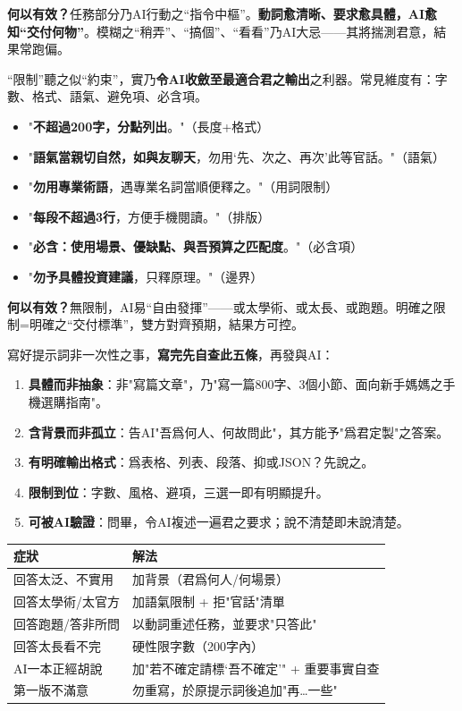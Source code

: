 \textbf{何以有效？}任務部分乃AI行動之“指令中樞”。\textbf{動詞愈清晰、要求愈具體，AI愈知“交付何物”}。模糊之“稍弄”、“搞個”、“看看”乃AI大忌——其將揣測君意，結果常跑偏。


“限制”聽之似“約束”，實乃\textbf{令AI收斂至最適合君之輸出}之利器。常見維度有：字數、格式、語氣、避免項、必含項。


\begin{itemize}
  \item "\textbf{不超過200字，分點列出}。"（長度+格式）
  \item "\textbf{語氣當親切自然，如與友聊天}，勿用‘先、次之、再次’此等官話。"（語氣）
  \item "\textbf{勿用專業術語}，遇專業名詞當順便釋之。"（用詞限制）
  \item "\textbf{每段不超過3行}，方便手機閱讀。"（排版）
  \item "\textbf{必含：使用場景、優缺點、與吾預算之匹配度}。"（必含項）
  \item "\textbf{勿予具體投資建議}，只釋原理。"（邊界）
\end{itemize}

\textbf{何以有效？}無限制，AI易“自由發揮”——或太學術、或太長、或跑題。明確之限制=明確之“交付標準”，雙方對齊預期，結果方可控。


寫好提示詞非一次性之事，\textbf{寫完先自查此五條}，再發與AI：

\begin{enumerate}
  \item \textbf{具體而非抽象}：非"寫篇文章"，乃"寫一篇800字、3個小節、面向新手媽媽之手機選購指南"。
  \item \textbf{含背景而非孤立}：告AI"吾爲何人、何故問此"，其方能予"爲君定製"之答案。
  \item \textbf{有明確輸出格式}：爲表格、列表、段落、抑或JSON？先說之。
  \item \textbf{限制到位}：字數、風格、避項，三選一即有明顯提升。
  \item \textbf{可被AI驗證}：問畢，令AI複述一遍君之要求；說不清楚即未說清楚。
\end{enumerate}


\begin{center}
\begin{tabularx}{\linewidth}{|X|X|}
\hline
\textbf{症狀} & \textbf{解法} \tabularnewline
\hline
回答太泛、不實用 & 加背景（君爲何人/何場景） \tabularnewline
回答太學術/太官方 & 加語氣限制 + 拒"官話"清單 \tabularnewline
回答跑題/答非所問 & 以動詞重述任務，並要求"只答此" \tabularnewline
回答太長看不完 & 硬性限字數（200字內） \tabularnewline
AI一本正經胡說 & 加"若不確定請標‘吾不確定’" + 重要事實自查 \tabularnewline
第一版不滿意 & 勿重寫，於原提示詞後追加"再…一些" \tabularnewline
\hline
\end{tabularx}
\end{center}

